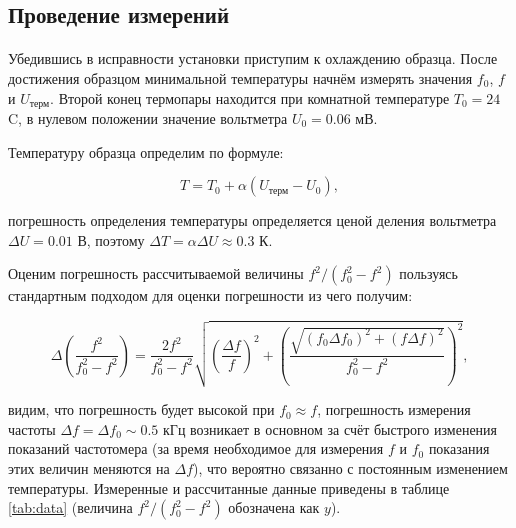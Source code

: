 \documentclass[a4paper,12pt]{article} %
\begin{document}
\subsection{Проведение измерений}

\paragraph{} 
	Убедившись в исправности установки приступим к охлаждению образца. После достижения образцом минимальной температуры начнём измерять значения $f_0$, $f$ и $U_\text{терм}$. Второй конец термопары находится при комнатной температуре $T_0 = 24$\degree C, в нулевом положении значение вольтметра $U_0 = 0.06$ мВ. 
	
	Температуру образца определим по формуле:
	
\begin{equation}
T = T_0 + \alpha \left(U_\text{терм} - U_0 \right),
\label{e:temp}
\end{equation}

\noindent погрешность определения температуры определяется ценой деления вольтметра $\Delta U = 0.01$ В, поэтому $\Delta T = \alpha \Delta U \approx 0.3$ К.

	Оценим погрешность рассчитываемой величины $f^2 / (f_0^2 - f^2)$ пользуясь стандартным подходом для оценки погрешности из чего получим:
	
\begin{equation}																				
\Delta \left( \frac{f^2}{f_0^2 - f^2} \right) = \frac{2 f^2}{f_0^2 - f^2} \sqrt{\left( \frac{\Delta f}{f} \right)^2 + \left( \frac{\sqrt{(f_0 \Delta f_0)^2 + (f \Delta f)^2}}{f_0^2 - f^2} \right)^2},
\label{e:fvalue_eror}																																																					
\end{equation}											

\noindent видим, что погрешность будет высокой при $f_0 \approx f$, погрешность измерения частоты $\Delta f = \Delta f_0 \sim 0.5$ кГц возникает в основном за счёт быстрого изменения показаний частотомера (за время необходимое для измерения $f$ и $f_0$ показания этих величин меняются на $\Delta f$), что вероятно связанно с постоянным изменением температуры. Измеренные и рассчитанные данные приведены в таблице \ref{tab:data} (величина $f^2 / (f_0^2 - f^2)$ обозначена как $y$).
\end{document}
